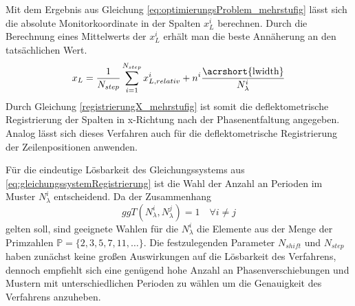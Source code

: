 %
Mit dem Ergebnis aus Gleichung \ref{eq:optimierungsProblem_mehrstufig} lässt sich die absolute Monitorkoordinate in der Spalten $x_L^i$ berechnen.
Durch die Berechnung eines Mittelwerts der $x_L^i$ erhält man die beste Annäherung an den tatsächlichen Wert.
%
\begin{equation}\label{registrierungX_mehrstufig}
	x_L = \dfrac{1}{N_{step}} \sum\limits_{i = 1}^{N_{step}} x_{L,relativ}^i + n^i \dfrac{\text{\acrshort{lwidth}}}{N_\lambda^i} 
\end{equation}
%
Durch Gleichung \ref{registrierungX_mehrstufig} ist somit die deflektometrische Registrierung der Spalten in x-Richtung nach der Phasenentfaltung angegeben.
Analog lässt sich dieses Verfahren auch für die deflektometrische Registrierung der Zeilenpositionen anwenden.

\p
Für die eindeutige Lösbarkeit des Gleichungssystems aus \ref{eq:gleichungssystemRegistrierung} ist die Wahl der Anzahl an Perioden im Muster $N_\lambda^i$ entscheidend.
Da der Zusammenhang
%
\begin{equation*}
	ggT(N_\lambda^i, N_\lambda^j) = 1
	\quad
	\forall i \neq j
\end{equation*}
%
gelten soll, sind geeignete Wahlen für die $N_\lambda^i$ die Elemente aus der Menge der Primzahlen $\mathbb{P} = \lbrace 2, 3, 5, 7, 11,\ldots\rbrace$.
Die festzulegenden Parameter $N_{shift}$ und $N_{step}$ haben zunächst keine großen Auswirkungen auf die Lösbarkeit des Verfahrens, dennoch empfiehlt sich eine genügend hohe Anzahl an Phasenverschiebungen und Mustern mit unterschiedlichen Perioden zu wählen um die Genauigkeit des Verfahrens anzuheben.